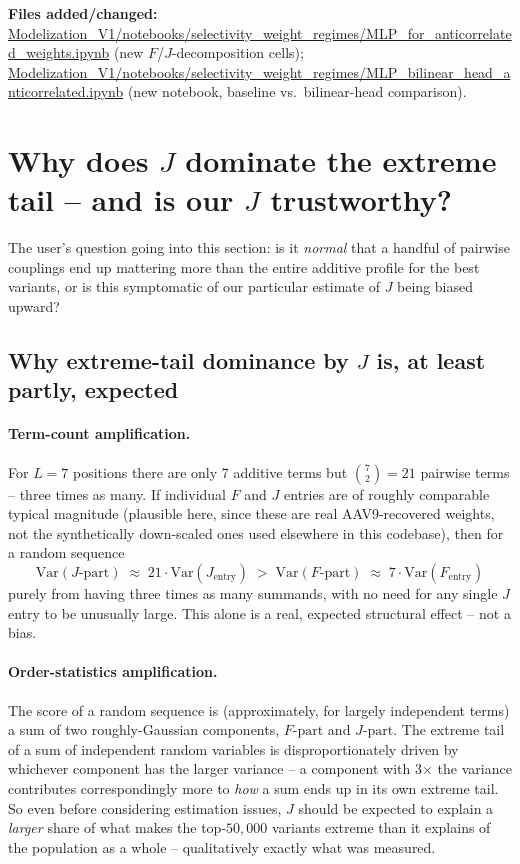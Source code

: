 \documentclass[11pt]{article}
\begin{document}
\textbf{Files added/changed:}
\url{Modelization_V1/notebooks/selectivity_weight_regimes/MLP_for_anticorrelated_weights.ipynb}
(new $F$/$J$-decomposition cells);
\url{Modelization_V1/notebooks/selectivity_weight_regimes/MLP_bilinear_head_anticorrelated.ipynb}
(new notebook, baseline vs.\ bilinear-head comparison).

\section{Why does $J$ dominate the extreme tail -- and is our $J$ trustworthy?}
\label{sec:why-j}

The user's question going into this section: is it \emph{normal} that a handful of pairwise
couplings end up mattering more than the entire additive profile for the best variants, or is this
symptomatic of our particular estimate of $J$ being biased upward?

\subsection{Why extreme-tail dominance by $J$ is, at least partly, expected}

\paragraph{Term-count amplification.} For $L=7$ positions there are only 7 additive terms but
$\binom{7}{2}=21$ pairwise terms -- three times as many. If individual $F$ and $J$ entries are of
roughly comparable typical magnitude (plausible here, since these are real AAV9-recovered weights,
not the synthetically down-scaled ones used elsewhere in this codebase), then for a random sequence
\[
  \mathrm{Var}(J\text{-part}) \;\approx\; 21 \cdot \mathrm{Var}(J_{\text{entry}})
  \;>\;
  \mathrm{Var}(F\text{-part}) \;\approx\; 7 \cdot \mathrm{Var}(F_{\text{entry}})
\]
purely from having three times as many summands, with no need for any single $J$ entry to be
unusually large. This alone is a real, expected structural effect -- not a bias.

\paragraph{Order-statistics amplification.} The score of a random sequence is (approximately, for
largely independent terms) a sum of two roughly-Gaussian components, $F\text{-part}$ and
$J\text{-part}$. The extreme tail of a sum of independent random variables is disproportionately
driven by whichever component has the larger variance -- a component with 3$\times$ the variance
contributes correspondingly more to \emph{how} a sum ends up in its own extreme tail. So even
before considering estimation issues, $J$ should be expected to explain a \emph{larger} share of
what makes the top-$50{,}000$ variants extreme than it explains of the population as a whole --
qualitatively exactly what was measured.
\end{document}
